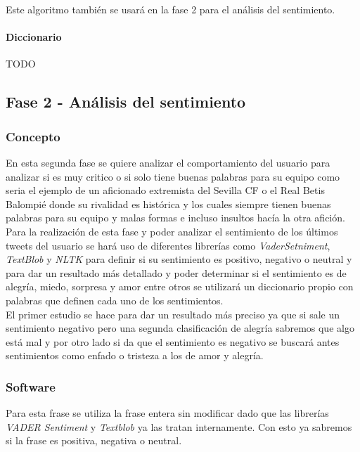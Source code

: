 \documentclass[../all.tex]{subfiles}
\begin{document}
        	Este algoritmo también se usará en la fase 2 para el análisis del sentimiento.
            
        \newpage
        \paragraph{Diccionario}
        	
            {\color{red} 
                TODO
            }

\newpage
\subsection{Fase 2 - Análisis del sentimiento}
    \subsubsection{Concepto}
    	En esta segunda fase se quiere analizar el comportamiento del usuario para analizar si es muy critico o si solo tiene buenas palabras para su equipo como seria el ejemplo de un aficionado extremista del Sevilla CF o el Real Betis Balompié donde su rivalidad es histórica y los cuales siempre tienen buenas palabras para su equipo y malas formas e incluso insultos hacía la otra afición.\\
    	
    	Para la realización de esta fase y poder analizar el sentimiento de los últimos tweets del usuario se hará uso de diferentes librerías como  \textit{VaderSetniment},  \textit{TextBlob} y  \textit{NLTK} para definir si su sentimiento es positivo, negativo o neutral y para dar un resultado más detallado y poder determinar si el sentimiento es de alegría, miedo, sorpresa y amor entre otros se utilizará un diccionario propio con palabras que definen cada uno de los sentimientos.\\
    	
    	 El primer estudio se hace para dar un resultado más preciso ya que si sale un sentimiento negativo pero una segunda clasificación de alegría sabremos que algo está mal y por otro lado si da que el sentimiento es negativo se buscará antes sentimientos como enfado o tristeza a los de amor y alegría.
    	 
    \newpage
    \subsubsection{Software}
    
    	Para esta frase se utiliza la frase entera sin modificar dado que las librerías \textit{VADER Sentiment} y \textit{Textblob} ya las tratan internamente. Con esto ya sabremos si la frase es positiva, negativa o neutral.\\
    	
\end{document}
